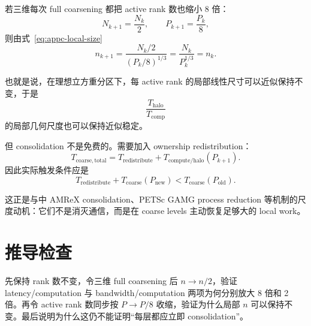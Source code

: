 若三维每次 full coarsening 都把 active rank 数也缩小 8 倍：
\begin{equation}
N_{k+1}=\frac{N_k}{2},
\qquad
P_{k+1}=\frac{P_k}{8},
\end{equation}
则由式~\eqref{eq:appc-local-size}
\begin{equation}
n_{k+1}
=
\frac{N_k/2}{(P_k/8)^{1/3}}
=
\frac{N_k}{P_k^{1/3}}
=
n_k.
\end{equation}

也就是说，在理想立方重分区下，每 active rank 的局部线性尺寸可以近似保持不变，于是
\begin{equation}
\frac{T_{\mathrm{halo}}}{T_{\mathrm{comp}}}
\end{equation}
的局部几何尺度也可以保持近似稳定。

但 consolidation 不是免费的。需要加入 ownership redistribution：
\begin{equation}
T_{\mathrm{coarse,total}}
=
T_{\mathrm{redistribute}}
+
T_{\mathrm{compute/halo}}(P_{k+1}).
\end{equation}
因此实际触发条件应是
\begin{equation}
\boxed{
T_{\mathrm{redistribute}}
+
T_{\mathrm{coarse}}(P_{\mathrm{new}})
<
T_{\mathrm{coarse}}(P_{\mathrm{old}}).
}
\end{equation}

这正是与中 AMReX consolidation、PETSc GAMG process reduction 等机制的尺度动机：它们不是消灭通信，而是在 coarse levels 主动恢复足够大的 local work。

\section*{推导检查}
\begin{checkpointbox}
先保持 rank 数不变，令三维 full coarsening 后 $n\to n/2$，验证 latency/computation 与 bandwidth/computation 两项为何分别放大 8 倍和 2 倍。再令 active rank 数同步按 $P\to P/8$ 收缩，验证为什么局部 $n$ 可以保持不变。最后说明为什么这仍不能证明“每层都应立即 consolidation”。
\end{checkpointbox}
